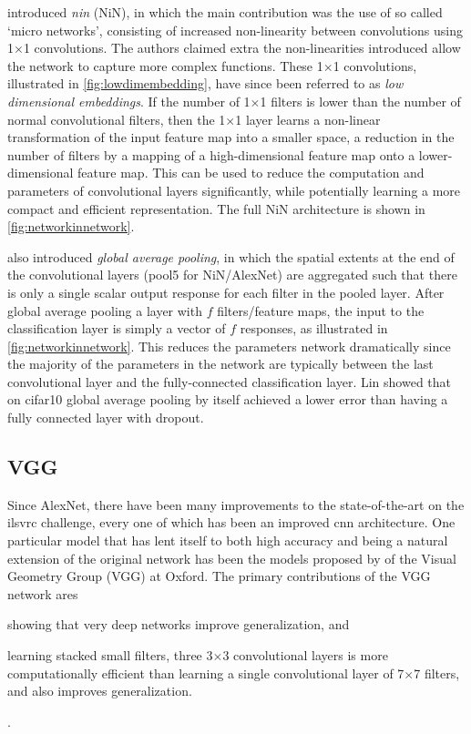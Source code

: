 \documentclass[thesis]{subfiles}
\begin{document}
\citet{Lin2013NiN} introduced \emph{\gls{nin}} (NiN), in which the main contribution was the use of so called `micro networks', consisting of increased non-linearity between convolutions using 1$\times$1 convolutions. The authors claimed extra the non-linearities introduced allow the network to capture more complex functions. These 1$\times $1 convolutions, illustrated in \cref{fig:lowdimembedding}, have since been referred to as \emph{low dimensional embeddings}. If the number of 1$\times$1 filters is lower than the number of normal convolutional filters, then the 1$\times$1 layer learns a non-linear transformation of the input feature map into a smaller space, \ie a reduction in the number of filters by a mapping of a high-dimensional feature map onto a lower-dimensional feature map. This can be used to reduce the computation and parameters of convolutional layers significantly, while potentially learning a more compact and efficient representation. The full NiN architecture is shown in \cref{fig:networkinnetwork}.

\citet{Lin2013NiN} also introduced \emph{global average pooling}, in which the spatial extents at the end of the convolutional layers (\ie pool5 for NiN/AlexNet) are aggregated such that there is only a single scalar output response for each filter in the pooled layer. After global average pooling a layer with $f$ filters/feature maps, the input to the classification layer is simply a vector of $f$ responses, as illustrated in \cref{fig:networkinnetwork}. This reduces the parameters network dramatically since the majority of the parameters in the network are typically between the last convolutional layer and the fully-connected classification layer. Lin \etal showed that on \gls{cifar10} global average pooling by itself achieved a lower error than having a fully connected layer with dropout.

\subsection{VGG}
Since AlexNet, there have been many improvements to the state-of-the-art on the \gls{ilsvrc} challenge, every one of which has been an improved \gls{cnn} architecture. One particular model that has lent itself to both high accuracy and being a natural extension of the original network has been the models proposed by \citet{Simonyan2014verydeep} of the Visual Geometry Group (VGG) at Oxford. The primary contributions of the VGG network ares
\begin{enumerate*}[label = (\textbf{\roman*})]
\item showing that very deep networks improve generalization, and
\item learning stacked small filters, \ie three 3$\times$3 convolutional layers is more computationally efficient than learning a single convolutional layer of 7$\times$7 filters, and also improves generalization.
\end{enumerate*}.
\end{document}
